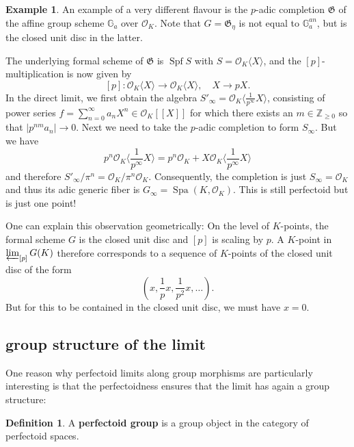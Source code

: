 \documentclass[10pt,oneside]{amsart}
\theoremstyle{definition}
\newtheorem{definition}[theorem]{Definition}
\newtheorem*{example}{Example}
\begin{document}
	
	\begin{example}
		An example of a very different flavour is  the $p$-adic completion  $\mathfrak G$  of the affine group scheme $\mathbb G_a$ over $\mathcal O_K$. Note that $G=\mathfrak G_\eta$ is not equal to $\mathbb G_a^{an}$, but is the closed unit disc in the latter.
		
		The underlying formal scheme of $\mathfrak G$ is $\operatorname {Spf} S$ with $S=\mathcal O_K\langle X \rangle$, and the $[p]$-multiplication is now given by
		\[[p]:\mathcal O_K\langle X \rangle\rightarrow  \mathcal O_K\langle X \rangle, \quad X\rightarrow pX.\]
		In the direct limit, we first obtain the algebra $S'_\infty  = \mathcal O_K\langle \frac{1}{p^\infty}X \rangle$, consisting of power series $f=\sum_{n=0}^\infty  a_nX^n\in \mathcal O_K[[X]]$ for which there exists an $m\in \mathbb Z_{\geq 0}$ so that $|p^{nm}a_n|\to 0$. Next we need to take the $p$-adic completion to form $S_\infty$. But we have 
		\[p^n\mathcal O_K\langle \frac{1}{p^\infty}X \rangle = p^n\mathcal O_K + X \mathcal O_K\langle \frac{1}{p^\infty}X \rangle\]
		and therefore $S'_\infty/\pi^n=\mathcal O_K/\pi^n\mathcal O_K$. Consequently, the completion is just $S_\infty = \mathcal O_K$ and thus its adic generic fiber is $G_\infty = \operatorname{Spa}(K,\mathcal O_K)$.  This is still perfectoid but is just one point!
		
		One can explain this observation geometrically: On the level of $K$-points, the formal scheme $G$ is the closed unit disc and $[p]$ is scaling by $p$. A $K$-point in $\varprojlim_{[p]} G(K)$ therefore corresponds to a sequence of $K$-points of the closed unit disc of the form 
		$$(x,\frac{1}{p}x,\frac{1}{p^2}x,\dots).$$ But for this to be contained in the closed unit disc, we must have $x=0$. 
		
	\end{example}
	
 
 
	
 
	
		
	\subsection{group structure of the limit}
	
	One reason why perfectoid limits along group morphisms are particularly interesting is that the perfectoidness ensures that the limit has again a group structure:
	
	\begin{definition}
		A \textbf{perfectoid group} is a group object in the category of perfectoid spaces.
	\end{definition}
	
\end{document}
